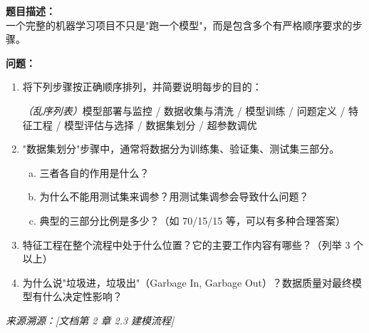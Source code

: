 \documentclass[a4paper,11pt]{ctexart}
\begin{document}
\begin{problembox}
    \textbf{题目描述：}\\
    一个完整的机器学习项目不只是"跑一个模型"，而是包含多个有严格顺序要求的步骤。

    \vspace{0.3cm}
    \textbf{问题：}
    \begin{enumerate}[(1)]
        \item 将下列步骤按正确顺序排列，并简要说明每步的目的：

        \textit{（乱序列表）}模型部署与监控 / 数据收集与清洗 / 模型训练 / 问题定义 / 特征工程 / 模型评估与选择 / 数据集划分 / 超参数调优

        \item "数据集划分"步骤中，通常将数据分为训练集、验证集、测试集三部分。
        \begin{enumerate}[a.]
            \item 三者各自的作用是什么？
            \item 为什么不能用测试集来调参？用测试集调参会导致什么问题？
            \item 典型的三部分比例是多少？（如 70/15/15 等，可以有多种合理答案）
        \end{enumerate}

        \item 特征工程在整个流程中处于什么位置？它的主要工作内容有哪些？（列举 3 个以上）

        \item 为什么说"垃圾进，垃圾出"（Garbage In, Garbage Out）？数据质量对最终模型有什么决定性影响？
    \end{enumerate}
    {\color{gray}\small\textit{来源溯源：[文档第 2 章 2.3 建模流程]}}
\end{problembox}
\end{document}
